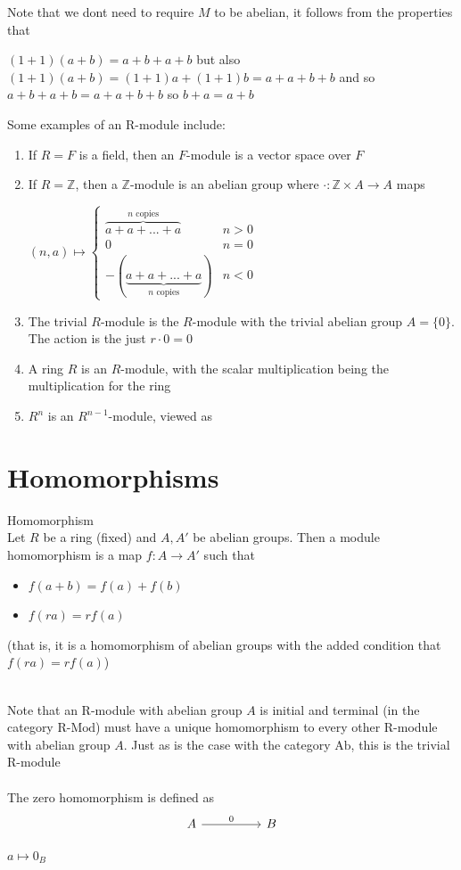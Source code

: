 \documentclass{report}
\begin{document}
Note that we dont need to require $M$ to be abelian, it follows from the properties that
\begin{center}
    $(1+1)(a+b)=a+b+a+b$ but also \\
    $(1+1)(a+b)=(1+1)a+(1+1)b=a+a+b+b$ and so \\
    $a+b+a+b = a+a+b+b$ so $b+a=a+b$
\end{center}
Some examples of an R-module include:
\begin{enumerate}
    \item If $R = F$ is a field, then an $F$-module is a vector space over $F$
    \item If $R=\mathbb{Z}$, then a $\mathbb{Z}$-module is an abelian group where $\cdot :\mathbb{Z} \times A \to A$ maps 
    \begin{center}
        $(n,a) \mapsto \begin{cases}
            \overbrace{a+a+...+a}^{n \text{ copies}} & n>0 \\ 0 & n=0 \\ -(\underbrace{a+a+...+a}_{n \text{ copies}}) & n < 0
        \end{cases}$
    \end{center}
    \item The trivial $R$-module is the $R$-module with the trivial abelian group $A = \{0\}$. The action is the just $r\cdot 0=0$
    \item A ring $R$ is an $R$-module, with the scalar multiplication being the multiplication for the ring
    \item $R^n$ is an $R^{n-1}$-module, viewed as 
\end{enumerate}
\newpage 
\section{Homomorphisms}
\begin{definition}{Homomorphism}{} \\
Let $R$ be a ring (fixed) and $A, A'$ be abelian groups. Then a module homomorphism is a map $f: A\to A'$ such that 
\begin{itemize}
    \item $f(a+b)=f(a)+f(b)$
    \item $f(ra)=rf(a)$
\end{itemize}
(that is, it is a homomorphism of abelian groups with the added condition that $f(ra)=rf(a)$)
\end{definition}
~\\
Note that an R-module with abelian group $A$ is initial and terminal (in the category $\text{R-Mod}$) must have a unique homomorphism to every other R-module with abelian group $A$. Just as is the case with the category $\text{Ab}$, this is the trivial R-module \\ ~\\
The zero homomorphism is defined as
\[
\begin{tikzcd}[column sep=huge, row sep=huge]
A \arrow[r, "0"] & B 
\end{tikzcd}
\]
\begin{center}
    $a \mapsto 0_B$
\end{center}
\end{document}
